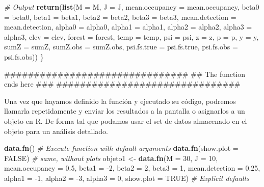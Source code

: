 \documentclass[]{book}
\newenvironment{Shaded}{\begin{snugshade}}{\end{snugshade}}
\newcommand{\KeywordTok}[1]{\textcolor[rgb]{0.13,0.29,0.53}{\textbf{{#1}}}}
\newcommand{\DataTypeTok}[1]{\textcolor[rgb]{0.13,0.29,0.53}{{#1}}}
\newcommand{\DecValTok}[1]{\textcolor[rgb]{0.00,0.00,0.81}{{#1}}}
\newcommand{\FloatTok}[1]{\textcolor[rgb]{0.00,0.00,0.81}{{#1}}}
\newcommand{\StringTok}[1]{\textcolor[rgb]{0.31,0.60,0.02}{{#1}}}
\newcommand{\CommentTok}[1]{\textcolor[rgb]{0.56,0.35,0.01}{\textit{{#1}}}}
\newcommand{\OtherTok}[1]{\textcolor[rgb]{0.56,0.35,0.01}{{#1}}}
\newcommand{\NormalTok}[1]{{#1}}
\begin{document}
\begin{Shaded}
\begin{Highlighting}[]
\CommentTok{# Output}
\KeywordTok{return}\NormalTok{(}\KeywordTok{list}\NormalTok{(}\DataTypeTok{M =} \NormalTok{M, }\DataTypeTok{J =} \NormalTok{J, }\DataTypeTok{mean.occupancy =} \NormalTok{mean.occupancy, }
            \DataTypeTok{beta0 =} \NormalTok{beta0, }\DataTypeTok{beta1 =} \NormalTok{beta1, }\DataTypeTok{beta2 =} \NormalTok{beta2, }\DataTypeTok{beta3 =} \NormalTok{beta3, }
            \DataTypeTok{mean.detection =} \NormalTok{mean.detection, }
            \DataTypeTok{alpha0 =} \NormalTok{alpha0, }\DataTypeTok{alpha1 =} \NormalTok{alpha1, }\DataTypeTok{alpha2 =} \NormalTok{alpha2, }\DataTypeTok{alpha3 =} \NormalTok{alpha3, }
            \DataTypeTok{elev =} \NormalTok{elev, }\DataTypeTok{forest =} \NormalTok{forest, }\DataTypeTok{temp =} \NormalTok{temp, }
            \DataTypeTok{psi =} \NormalTok{psi, }\DataTypeTok{z =} \NormalTok{z, }\DataTypeTok{p =} \NormalTok{p, }\DataTypeTok{y =} \NormalTok{y, }\DataTypeTok{sumZ =} \NormalTok{sumZ, }\DataTypeTok{sumZ.obs =} \NormalTok{sumZ.obs, }
            \DataTypeTok{psi.fs.true =} \NormalTok{psi.fs.true, }\DataTypeTok{psi.fs.obs =} \NormalTok{psi.fs.obs))}
\NormalTok{\}}

\NormalTok{###############################}
\NormalTok{## The function ends  here  ###}
\NormalTok{###############################}
\end{Highlighting}
\end{Shaded}

Una vez que hayamos definido la función y ejecutado su código, podremos
llamarla repetidamente y enviar los resultados a la pantalla o
asignarlos a un objeto en R. De forma tal que podamos usar el set de
datos almacenado en el objeto para un análisis detallado.

\begin{Shaded}
\begin{Highlighting}[]
\KeywordTok{data.fn}\NormalTok{()                  }\CommentTok{# Execute function with default arguments}
\KeywordTok{data.fn}\NormalTok{(}\DataTypeTok{show.plot =} \OtherTok{FALSE}\NormalTok{) }\CommentTok{# same, without plots}
\NormalTok{objeto1 <-}\StringTok{ }\KeywordTok{data.fn}\NormalTok{(}\DataTypeTok{M =} \DecValTok{30}\NormalTok{, }\DataTypeTok{J =} \DecValTok{10}\NormalTok{, }\DataTypeTok{mean.occupancy =} \FloatTok{0.5}\NormalTok{, }
                   \DataTypeTok{beta1 =} \NormalTok{-}\DecValTok{2}\NormalTok{, }\DataTypeTok{beta2 =} \DecValTok{2}\NormalTok{, }\DataTypeTok{beta3 =} \DecValTok{1}\NormalTok{, }
                   \DataTypeTok{mean.detection =} \FloatTok{0.25}\NormalTok{, }\DataTypeTok{alpha1 =} \NormalTok{-}\DecValTok{1}\NormalTok{,}
                   \DataTypeTok{alpha2 =} \NormalTok{-}\DecValTok{3}\NormalTok{, }\DataTypeTok{alpha3 =} \DecValTok{0}\NormalTok{, }\DataTypeTok{show.plot =} \OtherTok{TRUE}\NormalTok{) }\CommentTok{# Explicit defaults}
\end{Highlighting}
\end{Shaded}
\end{document}
